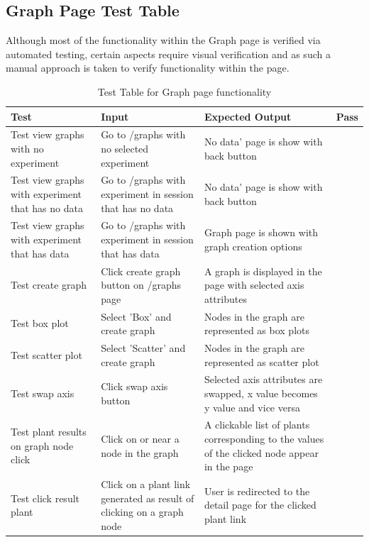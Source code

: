 \subsection{Graph Page Test Table}
Although most of the functionality within the Graph page is verified via automated testing, certain aspects require visual verification and as such a manual approach is taken to verify functionality within the page.
\begin{table}[H]
\centering
\begin{tabular}{ | p{4cm} | p{4cm} |p{4cm} | p{1cm} | }
\hline
	Test & Input & Expected Output & Pass \\ \hline
	Test view graphs with no experiment & Go to /graphs with no selected experiment & No data' page is show with back button & \checkmark \\ \hline
	Test view graphs with experiment that has no  data & Go to /graphs with experiment in session that has no data & No data' page is show with back button & \checkmark \\ \hline
	Test view graphs with experiment that has data & Go to /graphs with experiment in session that has data & Graph page is shown with graph creation options & \checkmark \\ \hline
	Test create graph & Click create graph button on /graphs page & A graph is displayed in the page with selected axis attributes & \checkmark \\ \hline
	Test box plot & Select 'Box' and create graph & Nodes in the graph are represented as box plots & \checkmark \\ \hline
	Test scatter plot & Select 'Scatter' and create graph & Nodes in the graph are represented as scatter plot & \checkmark \\ \hline
	Test swap axis & Click swap axis button & Selected axis attributes are swapped, x value becomes y value and vice versa & \checkmark \\ \hline
	Test plant results on graph node click & Click on or near a node in the graph & A  clickable list of plants corresponding to the values of the clicked node appear in the page & \checkmark \\ \hline
	Test click result plant & Click on a plant link generated as result of clicking on a graph node & User is redirected to the detail page for the clicked plant link & \checkmark \\ \hline
\end{tabular}
\caption{Test Table for Graph page functionality}
\label{test_table_graph}
\end{table}


